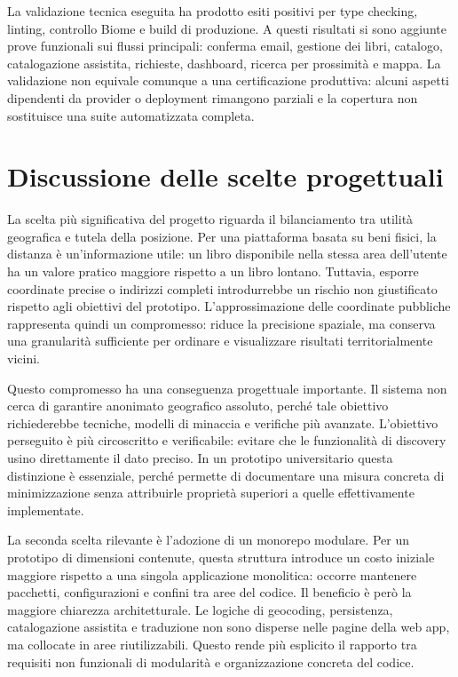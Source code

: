 La validazione tecnica eseguita ha prodotto esiti positivi per type checking, linting, controllo Biome e build di produzione. A questi risultati si sono aggiunte prove funzionali sui flussi principali: conferma email, gestione dei libri, catalogo, catalogazione assistita, richieste, dashboard, ricerca per prossimità e mappa. La validazione non equivale comunque a una certificazione produttiva: alcuni aspetti dipendenti da provider o deployment rimangono parziali e la copertura non sostituisce una suite automatizzata completa.

\section{Discussione delle scelte progettuali}
\label{sec:discussione-scelte}

La scelta più significativa del progetto riguarda il bilanciamento tra utilità geografica e tutela della posizione. Per una piattaforma basata su beni fisici, la distanza è un'informazione utile: un libro disponibile nella stessa area dell'utente ha un valore pratico maggiore rispetto a un libro lontano. Tuttavia, esporre coordinate precise o indirizzi completi introdurrebbe un rischio non giustificato rispetto agli obiettivi del prototipo. L'approssimazione delle coordinate pubbliche rappresenta quindi un compromesso: riduce la precisione spaziale, ma conserva una granularità sufficiente per ordinare e visualizzare risultati territorialmente vicini.

Questo compromesso ha una conseguenza progettuale importante. Il sistema non cerca di garantire anonimato geografico assoluto, perché tale obiettivo richiederebbe tecniche, modelli di minaccia e verifiche più avanzate. L'obiettivo perseguito è più circoscritto e verificabile: evitare che le funzionalità di discovery usino direttamente il dato preciso. In un prototipo universitario questa distinzione è essenziale, perché permette di documentare una misura concreta di minimizzazione senza attribuirle proprietà superiori a quelle effettivamente implementate.

La seconda scelta rilevante è l'adozione di un monorepo modulare. Per un prototipo di dimensioni contenute, questa struttura introduce un costo iniziale maggiore rispetto a una singola applicazione monolitica: occorre mantenere pacchetti, configurazioni e confini tra aree del codice. Il beneficio è però la maggiore chiarezza architetturale. Le logiche di geocoding, persistenza, catalogazione assistita e traduzione non sono disperse nelle pagine della web app, ma collocate in aree riutilizzabili. Questo rende più esplicito il rapporto tra requisiti non funzionali di modularità e organizzazione concreta del codice.

